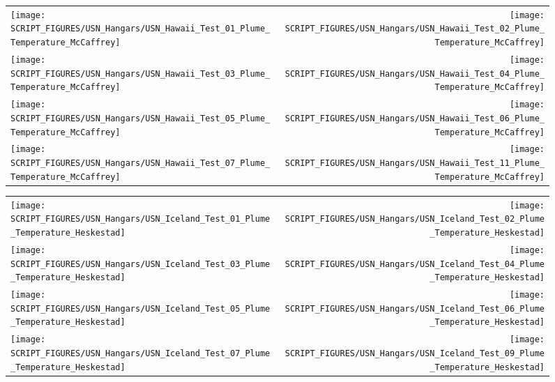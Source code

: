 \begin{figure}[p]
\begin{tabular*}{\textwidth}{l@{\extracolsep{\fill}}r}
\texttt{[image: SCRIPT\_FIGURES/USN\_Hangars/USN\_Hawaii\_Test\_01\_Plume\_Temperature\_McCaffrey]} &
\texttt{[image: SCRIPT\_FIGURES/USN\_Hangars/USN\_Hawaii\_Test\_02\_Plume\_Temperature\_McCaffrey]} \\
\texttt{[image: SCRIPT\_FIGURES/USN\_Hangars/USN\_Hawaii\_Test\_03\_Plume\_Temperature\_McCaffrey]} &
\texttt{[image: SCRIPT\_FIGURES/USN\_Hangars/USN\_Hawaii\_Test\_04\_Plume\_Temperature\_McCaffrey]} \\
\texttt{[image: SCRIPT\_FIGURES/USN\_Hangars/USN\_Hawaii\_Test\_05\_Plume\_Temperature\_McCaffrey]} &
\texttt{[image: SCRIPT\_FIGURES/USN\_Hangars/USN\_Hawaii\_Test\_06\_Plume\_Temperature\_McCaffrey]} \\
\texttt{[image: SCRIPT\_FIGURES/USN\_Hangars/USN\_Hawaii\_Test\_07\_Plume\_Temperature\_McCaffrey]} &
\texttt{[image: SCRIPT\_FIGURES/USN\_Hangars/USN\_Hawaii\_Test\_11\_Plume\_Temperature\_McCaffrey]}
\end{tabular*}
\end{figure}

\begin{figure}[p]
\begin{tabular*}{\textwidth}{l@{\extracolsep{\fill}}r}
\texttt{[image: SCRIPT\_FIGURES/USN\_Hangars/USN\_Iceland\_Test\_01\_Plume\_Temperature\_Heskestad]} &
\texttt{[image: SCRIPT\_FIGURES/USN\_Hangars/USN\_Iceland\_Test\_02\_Plume\_Temperature\_Heskestad]} \\
\texttt{[image: SCRIPT\_FIGURES/USN\_Hangars/USN\_Iceland\_Test\_03\_Plume\_Temperature\_Heskestad]} &
\texttt{[image: SCRIPT\_FIGURES/USN\_Hangars/USN\_Iceland\_Test\_04\_Plume\_Temperature\_Heskestad]} \\
\texttt{[image: SCRIPT\_FIGURES/USN\_Hangars/USN\_Iceland\_Test\_05\_Plume\_Temperature\_Heskestad]} &
\texttt{[image: SCRIPT\_FIGURES/USN\_Hangars/USN\_Iceland\_Test\_06\_Plume\_Temperature\_Heskestad]} \\
\texttt{[image: SCRIPT\_FIGURES/USN\_Hangars/USN\_Iceland\_Test\_07\_Plume\_Temperature\_Heskestad]} &
\texttt{[image: SCRIPT\_FIGURES/USN\_Hangars/USN\_Iceland\_Test\_09\_Plume\_Temperature\_Heskestad]}
\end{tabular*}
\end{figure}

